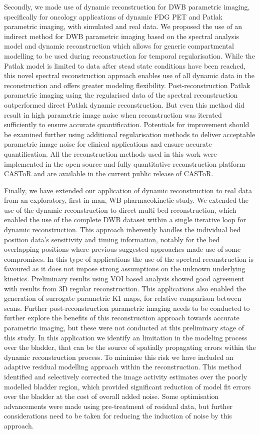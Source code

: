 Secondly, we made use of dynamic reconstruction for DWB parametric imaging, specifically for oncology applications of dynamic FDG PET and Patlak parametric imaging, with simulated and real data. 
We proposed the use of an indirect method for DWB parametric imaging based on the spectral analysis model and dynamic reconstruction which allows for generic compartmental modelling to be used during reconstruction for temporal regularisation. While the Patlak model is limited to data after stead state conditions have been reached, this novel spectral reconstruction approach enables use of all dynamic data in the reconstruction and offers greater modeling flexibility. Post-reconstruction Patlak parametric imaging using the regularised data of the spectral reconstruction outperformed direct Patlak dynamic reconstruction. But even this method did result in high parametric image noise when reconstruction was iterated sufficiently to ensure accurate quantification. Potentials for improvement should be examined further using additional regularisation methods to deliver acceptable parametric image noise for clinical applications and ensure accurate quantification.
All the reconstruction methods used in this work were implemented in the open source and fully quantitative reconstruction platform CASToR and are available in the current public release of CASToR. 

Finally, we have extended our application of dynamic reconstruction to real data from an exploratory, first in man, WB pharmacokinetic study. We extended the use of the dynamic reconstruction to direct multi-bed reconstruction, which enabled the use of the complete DWB dataset within a single iterative loop for dynamic reconstruction. This approach inherently handles the individual bed position data's sensitivity and timing information, notably for the bed overlapping positions where previous suggested approaches made use of some compromises. In this type of applications the use of the spectral reconstruction is favoured as it does not impose strong assumptions on the unknown underlying kinetics. Preliminary results using VOI based analysis showed good agreement with results from 3D regular reconstruction. This applications also enabled the generation of surrogate parametric K1 maps, for relative comparison between scans.
Further post-reconstruction parametric imaging needs to be conducted to further explore the benefits of this reconstruction approach towards accurate parametric imaging, but these were not conducted at this preliminary stage of this study.
In this application we identify an limitation in the modeling process over the bladder, that can be the source of spatially propagating errors within the dynamic reconstruction process. 
To minimise this risk we have included an adaptive residual modelling approach within the reconstruction. This method identified and selectively corrected the image activity estimates over the poorly modelled bladder region, which provided significant reduction of model fit errors over the bladder at the cost of overall added noise. Some optimisation advancements were made using pre-treatment of residual data, but further considerations need to be taken for reducing the induction of noise by this approach. 

